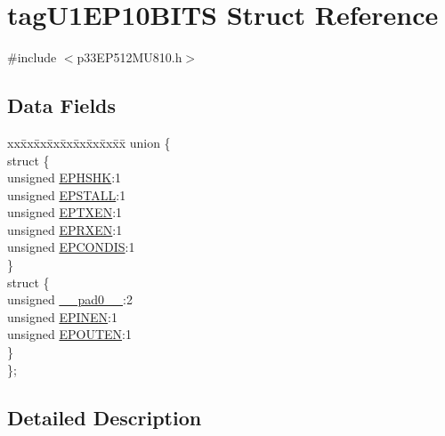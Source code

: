 \hypertarget{structtag_u1_e_p10_b_i_t_s}{}\section{tag\+U1\+E\+P10\+B\+I\+TS Struct Reference}
\label{structtag_u1_e_p10_b_i_t_s}


{\ttfamily \#include $<$p33\+E\+P512\+M\+U810.\+h$>$}

\subsection*{Data Fields}
\begin{DoxyCompactItemize}
\item 
\begin{tabbing}
xx\=xx\=xx\=xx\=xx\=xx\=xx\=xx\=xx\=\kill
union \{\\
\>struct \{\\
\>\>unsigned \hyperlink{structtag_u1_e_p10_b_i_t_s_a0d06430217cb4b189fbe9d0c4b460482}{EPHSHK}:1\\
\>\>unsigned \hyperlink{structtag_u1_e_p10_b_i_t_s_a47042104f04ebe06a23f9789bd400d7e}{EPSTALL}:1\\
\>\>unsigned \hyperlink{structtag_u1_e_p10_b_i_t_s_aa2d88c1be513e759c136823c86a355b4}{EPTXEN}:1\\
\>\>unsigned \hyperlink{structtag_u1_e_p10_b_i_t_s_a8a388d32ceffb87230e660b6793f2857}{EPRXEN}:1\\
\>\>unsigned \hyperlink{structtag_u1_e_p10_b_i_t_s_a1bd26df05d2b5a11b20ee548fce90c3e}{EPCONDIS}:1\\
\>\} \\
\>struct \{\\
\>\>unsigned \hyperlink{structtag_u1_e_p10_b_i_t_s_adf71f3d8410c1f1dbbc96680a92c49af}{\_\_pad0\_\_}:2\\
\>\>unsigned \hyperlink{structtag_u1_e_p10_b_i_t_s_a8b6d98cdf233ac90ff19d16d9a89215e}{EPINEN}:1\\
\>\>unsigned \hyperlink{structtag_u1_e_p10_b_i_t_s_adf87e8acfbb27a5626e21b3e3bd106fd}{EPOUTEN}:1\\
\>\} \\
\}; \\

\end{tabbing}\end{DoxyCompactItemize}


\subsection{Detailed Description}


